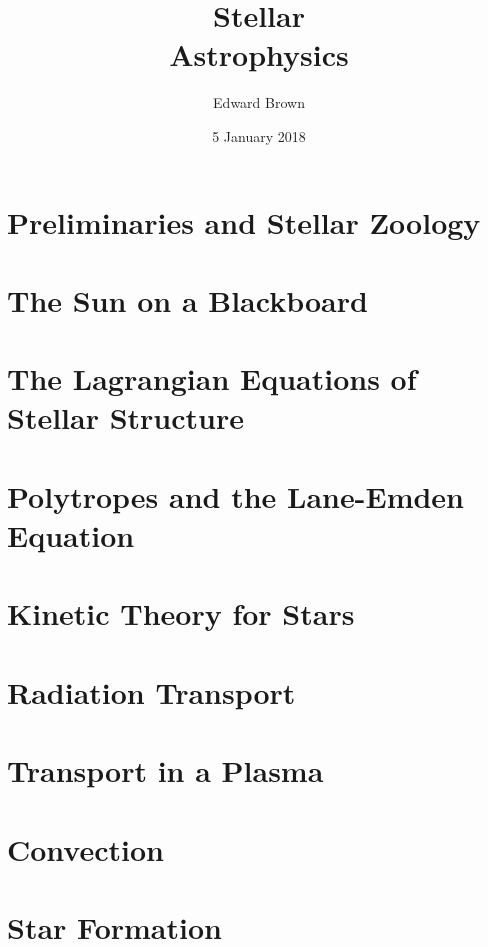 \documentclass{astro-bookshelf}
\title{Stellar\\Astrophysics}
\author{Edward Brown}
\date{5 January 2018}
\begin{document}
\frontmatter
{}


\mainmatter
{}
\setcounter{page}{1}


\chapter[Preliminaries]{Preliminaries and Stellar Zoology}\label{ch.prelim}


\chapter{The Sun on a Blackboard}\label{ch.introduction}


\chapter[Equations of Stellar Structure]{The Lagrangian Equations of Stellar Structure}\label{ch.stellar-structure-eqn}


\chapter[Polytropes]{Polytropes and the Lane-Emden Equation}\label{ch.polytropes}


\chapter[Kinetic Theory]{Kinetic Theory for Stars}\label{ch.kinetic}
%

\chapter{Radiation Transport}


\chapter{Transport in a Plasma}\label{ch.plasma-transport}


\chapter{Convection}\label{s.convection}


\chapter{Star Formation}\label{ch.star-formation}

\end{document}
